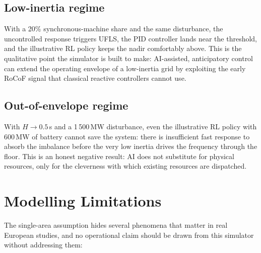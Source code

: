 \documentclass[conference]{IEEEtran}
\begin{document}
\subsection{Low-inertia regime}
With a 20\% synchronous-machine share and the same disturbance, the uncontrolled response triggers UFLS, the PID controller lands near the threshold, and the illustrative RL policy keeps the nadir comfortably above. This is the qualitative point the simulator is built to make: AI-assisted, anticipatory control can extend the operating envelope of a low-inertia grid by exploiting the early RoCoF signal that classical reactive controllers cannot use.

\subsection{Out-of-envelope regime}
With $H \to 0.5$\,s and a 1\,500\,MW disturbance, even the illustrative RL policy with 600\,MW of battery cannot save the system: there is insufficient fast response to absorb the imbalance before the very low inertia drives the frequency through the floor. This is an honest negative result: AI does not substitute for physical resources, only for the cleverness with which existing resources are dispatched.

\section{Modelling Limitations}\label{sec:limits}
The single-area assumption hides several phenomena that matter in real European studies, and no operational claim should be drawn from this simulator without addressing them:
\end{document}
